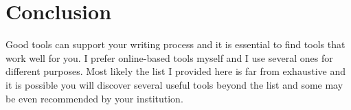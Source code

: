 \section{Conclusion}

Good tools can support your writing process and it is essential to find tools that work well for you.
I prefer online-based tools myself and I use several ones for different purposes. Most likely the list I provided here is far from exhaustive and it is possible you will discover several useful tools beyond the list and some may be even recommended by your institution.
